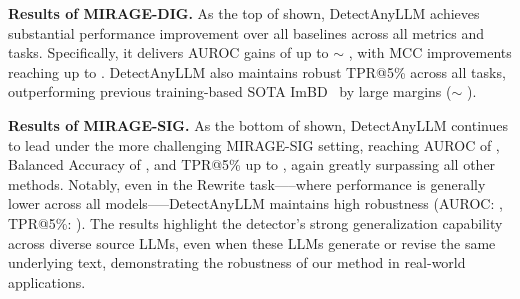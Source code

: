 \noindent \textbf{Results of MIRAGE-DIG. }
As the top of  shown, DetectAnyLLM achieves substantial performance improvement over all baselines across all metrics and tasks.
%
Specifically, it delivers AUROC gains of up to $\sim$ , with MCC improvements reaching up to .
%
DetectAnyLLM also maintains robust TPR@5\% across all tasks, outperforming previous training-based SOTA ImBD~\cite{imbd} by large margins ($\sim$ ).

\noindent \textbf{Results of MIRAGE-SIG. }
As the bottom of  shown, DetectAnyLLM continues to lead under the more challenging MIRAGE-SIG setting, reaching AUROC of , Balanced Accuracy of , and TPR@5\% up to , again greatly surpassing all other methods. 
%
Notably, even in the Rewrite task—--where performance is generally lower across all models--—DetectAnyLLM maintains high robustness (AUROC: , TPR@5\%: ).
%
The results highlight the detector’s strong generalization capability across diverse source LLMs, even when these LLMs generate or revise the same underlying text, demonstrating the robustness of our method in real-world applications.


